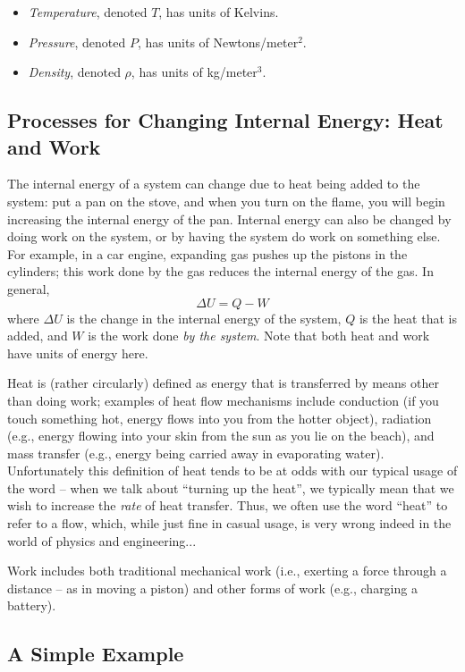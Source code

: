 \documentclass[10pt]{book}
\begin{document}
\begin{itemize}
\item {\it Temperature}, denoted $T$, has units of Kelvins.
\item {\it Pressure}, denoted $P$, has units of Newtons/meter$^2$.
\item {\it Density}, denoted $\rho$, has units of kg/meter$^3$.
\end{itemize}

\subsection{Processes for Changing Internal Energy: Heat and Work}

The internal energy of a system can change due to heat being added to the system: put a pan on the stove, and when you turn on the flame, you will begin increasing the internal energy of the pan.   Internal energy can also be changed by doing work on the system, or by having the system do work on something else.  For example, in a car engine, expanding gas pushes up the pistons in the cylinders; this work done by the gas reduces the internal energy of the gas.  In general,
$$\Delta U = Q - W$$
where  $\Delta U$ is the change in the internal energy of the system, $Q$ is the heat that is added, and $W$ is the work done {\it by the system}.  Note that both heat and work have units of energy here.  

Heat is (rather circularly) defined as energy that is transferred by means other than doing work; examples of heat flow mechanisms include conduction (if you touch something hot, energy flows into you from the hotter object), radiation (e.g., energy flowing into your skin from the sun as you lie on the beach), and mass transfer (e.g., energy being carried away in evaporating water).  Unfortunately this definition of heat tends to be at odds with our typical usage of the word -- when we talk about ``turning up the heat'', we typically mean that we wish to increase the {\it rate} of heat transfer. Thus, we often use the word ``heat'' to refer to a flow, which, while just fine in casual usage, is very wrong indeed in the world of physics and engineering...

Work includes both traditional mechanical work (i.e., exerting a force through a distance -- as in moving a piston) and other forms of work (e.g., charging a battery).

\subsection{A Simple Example}
\end{document}
